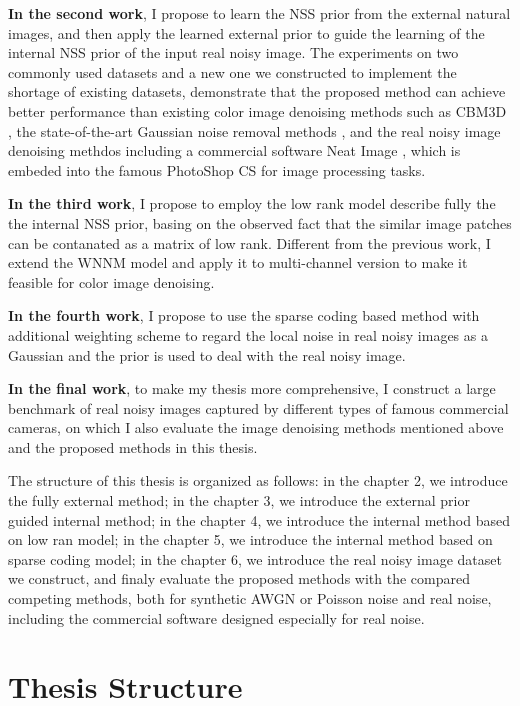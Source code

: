 \textbf{In the second work}, I propose to learn the NSS prior from the external natural images, and then apply the learned external prior to guide the learning of the internal NSS prior of the input real noisy image. The experiments on two commonly used datasets and a new one we constructed to implement the shortage of existing datasets, demonstrate that the proposed method can achieve better performance than existing color image denoising methods such as CBM3D \cite{cbm3d}, the state-of-the-art Gaussian noise removal methods \cite{bm3d,mlp,csr}, and the real noisy image denoising methdos \cite{} including a commercial software Neat Image \cite{neatimage}, which is embeded into the famous PhotoShop CS for image processing tasks.


\textbf{In the third work}, I propose to employ the low rank model describe fully the the internal NSS prior, basing on the observed fact that the similar image patches can be contanated as a matrix of low rank. Different from the previous work, I extend the WNNM model and apply it to multi-channel version to make it feasible for color image denoising. 


\textbf{In the fourth work}, I propose to use the sparse coding based method with additional weighting scheme to regard the local noise in real noisy images as a Gaussian and the prior is used to deal with the real noisy image.


\textbf{In the final work}, to make my thesis more comprehensive, I construct a large benchmark of real noisy images captured by different types of famous commercial cameras, on which I also evaluate the image denoising methods mentioned above and the proposed methods in this thesis. 


The structure of this thesis is organized as follows: in the chapter 2, we introduce the fully external method; in the chapter 3, we introduce the external prior guided internal method; in the chapter 4, we introduce the internal method based on low ran model; in the chapter 5, we introduce the internal method based on sparse coding model; in the chapter 6, we introduce the real noisy image dataset we construct, and finaly evaluate the proposed methods with the compared competing methods, both for synthetic AWGN or Poisson noise and real noise, including the commercial software designed especially for real noise. 


\section{Thesis Structure}
\label{sec:intro:structure}


